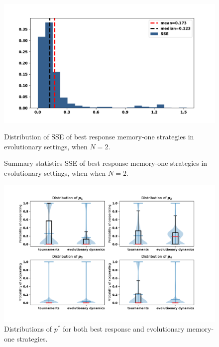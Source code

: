 \begin{figure}[!htbp]
    \begin{minipage}{0.72\textwidth}
            \begin{center}
            \includegraphics[width=\linewidth]{src/chapters/05/paper/Memory-size-in-the-prisoners-dilemma/img/evo_sserror.pdf}
            \end{center}
            \caption{Distribution of SSE of best response memory-one strategies in
            evolutionary settings, when \(N=2\).}
            \label{fig:sserror_mem_one}
    \end{minipage}\hspace{1cm}
    \begin{minipage}{0.21\textwidth}
        \centering
        \captionsetup{type=table}
        \resizebox{.85\columnwidth}{!}{%
            }
            \caption{Summary statistics SSE of best response memory-one strategies in
            evolutionary settings, when when \(N=2\).}
            \label{table:sserror_stats}
      \end{minipage}
\end{figure}

\begin{figure}[!htbp]
    \centering
    \includegraphics[width=.8\textwidth]{src/chapters/05/paper/Memory-size-in-the-prisoners-dilemma/img/behaviour_violin_plots.pdf}
    \caption{Distributions of \(p^*\) for both best response and evolutionary memory-one
    strategies.}
    \label{fig:behaviour_violin_plots}
\end{figure}

